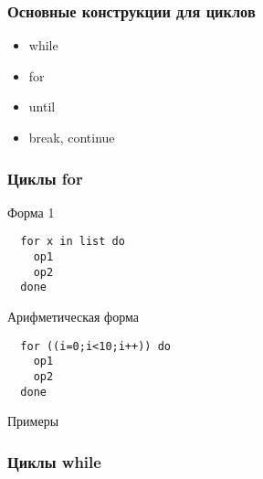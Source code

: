 \begin{frame}
\frametitle{Основные конструкции для циклов}
\begin{itemize}
 \item while
 \item for
 \item until
 \item break, continue 
\end{itemize}
\end{frame}

\begin{frame}
\frametitle{Циклы for}
\begin{block}{Форма 1}
\begin{lstlisting}
  for x in list do
    op1
    op2
  done
\end{lstlisting}
\end{block}
\begin{block}{Арифметическая форма}
\begin{lstlisting}
  for ((i=0;i<10;i++)) do
    op1
    op2
  done
\end{lstlisting}
\end{block}
\begin{block}{Примеры}
\end{block}
\end{frame}

\begin{frame}
\frametitle{Циклы while}
\end{frame}
